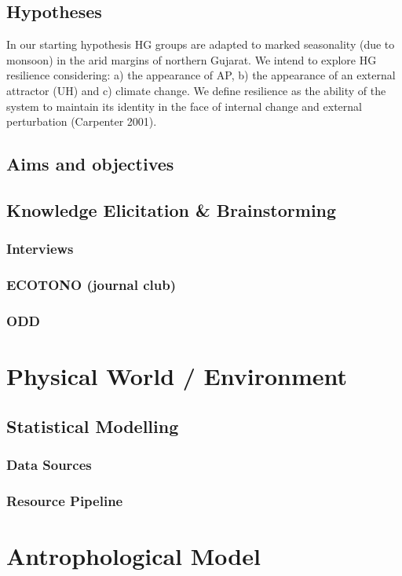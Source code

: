 \documentclass[11pt,oneside,a4paper,openright]{report}
\begin{document}
	    \subsection{Hypotheses}
In our starting hypothesis HG groups are adapted to marked seasonality (due to monsoon) in the arid margins of northern Gujarat. We intend to explore HG resilience considering: a) the appearance of AP, b) the appearance of an external attractor (UH) and c) climate change. We define resilience as the ability of the system to maintain its identity in the face of internal change and external perturbation (Carpenter 2001).
	    \subsection{Aims and objectives}
	    \subsection{Knowledge Elicitation \& Brainstorming}
		\subsubsection{Interviews}
		\subsubsection{ECOTONO (journal club)}
		\subsubsection{ODD}

	\section{Physical World / Environment}		%
		\subsection{Statistical Modelling}
			\subsubsection{Data Sources}
			\subsubsection{Resource Pipeline}

	\section{Antrophological Model}				%
\end{document}
